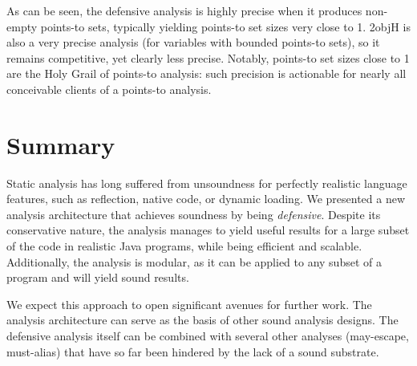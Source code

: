 As can be seen, the defensive analysis is highly precise when it produces non-empty points-to sets, typically yielding points-to set sizes very close to 1. 2objH is also a very precise analysis (for variables with bounded points-to sets), so it remains competitive, yet clearly less precise. Notably, points-to set sizes close to 1 are the Holy Grail of points-to analysis: such precision is actionable for nearly all conceivable clients of a points-to analysis.


\section{Summary}

Static analysis has long suffered from unsoundness for perfectly realistic language features, such as reflection, native code, or dynamic loading. We presented a new analysis architecture that achieves soundness by being \emph{defensive}. Despite its conservative nature, the analysis manages to yield useful results for a large subset of the code in realistic Java programs, while being efficient and scalable. Additionally, the analysis is modular, as it can be applied to any subset of a program and will yield sound results.

We expect this approach to open significant avenues for further work. The analysis architecture can serve as the basis of other sound analysis designs. The defensive analysis itself can be combined with several other analyses (may-escape, must-alias) that have so far been hindered by the lack of a sound substrate.
